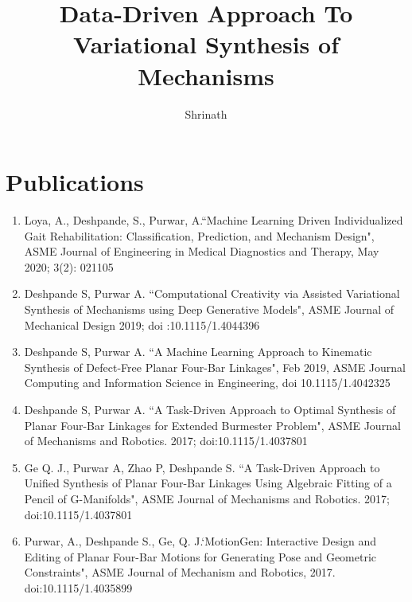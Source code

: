 \documentclass[defaultstyle,12pt]{thesis}
\title{Data-Driven Approach To Variational Synthesis of Mechanisms}
\author{Shrinath}{Deshpande}
\begin{document}
\clearpage

\printacronyms[include-classes=abbrev,name=Abbreviations]

\printacronyms[include-classes=nomencl,name=Nomenclature]

\clearpage
\chapter*{Publications}
{
\begin{enumerate}[leftmargin=0cm]
  \item{Loya, A., Deshpande, S., Purwar, A.``Machine Learning Driven Individualized Gait Rehabilitation: Classification, Prediction, and Mechanism Design", ASME Journal of Engineering in Medical Diagnostics and Therapy, May 2020; 3(2): 021105}
  \item{Deshpande S, Purwar A. ``Computational Creativity via Assisted Variational Synthesis of Mechanisms using Deep Generative Models", ASME Journal of Mechanical Design 2019; doi :10.1115/1.4044396}
  \item{Deshpande S, Purwar A. ``A Machine Learning Approach to Kinematic Synthesis of Defect-Free Planar Four-Bar Linkages", Feb 2019, ASME Journal Computing and Information Science in Engineering, doi 10.1115/1.4042325}
  \item{Deshpande S, Purwar A. ``A Task-Driven Approach to Optimal Synthesis of Planar Four-Bar Linkages for Extended Burmester Problem", ASME Journal of Mechanisms and Robotics. 2017; doi:10.1115/1.4037801}
  \item{Ge Q. J., Purwar A, Zhao P, Deshpande S. ``A Task-Driven Approach to Unified Synthesis of Planar Four-Bar Linkages Using Algebraic Fitting of a Pencil of G-Manifolds", ASME Journal of Mechanisms and Robotics. 2017; doi:10.1115/1.4037801}
  \item{Purwar, A., Deshpande S., Ge, Q. J.`MotionGen: Interactive Design and Editing of Planar Four-Bar Motions for Generating Pose and Geometric Constraints", ASME Journal of Mechanism and Robotics, 2017. doi:10.1115/1.4035899}
\end{enumerate}
}











\appendix
\end{document}
